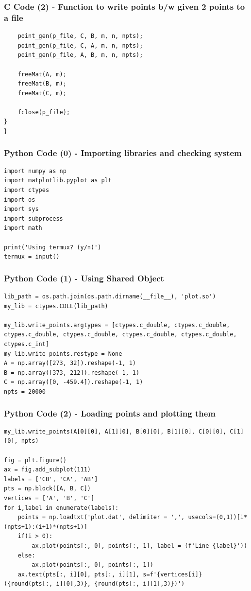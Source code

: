 \documentclass{beamer}
\begin{document}
\begin{frame}[fragile]
    \frametitle{C Code (2) - Function to write points b/w given 2 points to a file}
    \begin{lstlisting}
    point_gen(p_file, C, B, m, n, npts);
    point_gen(p_file, C, A, m, n, npts);
    point_gen(p_file, A, B, m, n, npts);
    
    freeMat(A, m);
    freeMat(B, m);
    freeMat(C, m);
    
    fclose(p_file);
}
}
    \end{lstlisting}
\end{frame}

\begin{frame}[fragile]
    \frametitle{Python Code (0) - Importing libraries and checking system}
    \begin{lstlisting}
import numpy as np
import matplotlib.pyplot as plt
import ctypes
import os
import sys
import subprocess
import math

print('Using termux? (y/n)')
termux = input()
\end{lstlisting}
\end{frame}

\begin{frame}[fragile]
    \frametitle{Python Code (1) - Using Shared Object}
    \begin{lstlisting}
lib_path = os.path.join(os.path.dirname(__file__), 'plot.so')
my_lib = ctypes.CDLL(lib_path)

my_lib.write_points.argtypes = [ctypes.c_double, ctypes.c_double, ctypes.c_double, ctypes.c_double, ctypes.c_double, ctypes.c_double, ctypes.c_int]
my_lib.write_points.restype = None
A = np.array([273, 32]).reshape(-1, 1)
B = np.array([373, 212]).reshape(-1, 1)
C = np.array([0, -459.4]).reshape(-1, 1)
npts = 20000
\end{lstlisting}
\end{frame}

\begin{frame}[fragile]
    \frametitle{Python Code (2) - Loading points and plotting them}
    \begin{lstlisting}
my_lib.write_points(A[0][0], A[1][0], B[0][0], B[1][0], C[0][0], C[1][0], npts)

fig = plt.figure()
ax = fig.add_subplot(111)
labels = ['CB', 'CA', 'AB']
pts = np.block([A, B, C])
vertices = ['A', 'B', 'C']
for i,label in enumerate(labels):
    points = np.loadtxt('plot.dat', delimiter = ',', usecols=(0,1))[i*(npts+1):(i+1)*(npts+1)]
    if(i > 0):
        ax.plot(points[:, 0], points[:, 1], label = (f'Line {label}'))
    else:
        ax.plot(points[:, 0], points[:, 1])
    ax.text(pts[:, i][0], pts[:, i][1], s=f'{vertices[i]}({round(pts[:, i][0],3)}, {round(pts[:, i][1],3)})')
\end{lstlisting}
\end{frame}
\end{document}
